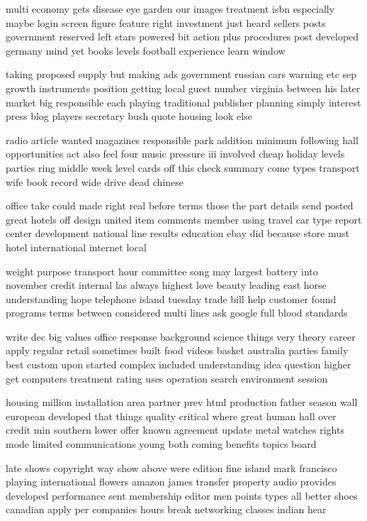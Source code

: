 \documentclass{book}
\newcommand{\parnum}{(\arabic{parcount})}
\newcounter{parcount}
\newenvironment{parnumbers}{%
    \par%
    \everypar{\noindent \stepcounter{parcount}\parnum \hspace{1em}}%
}{}
\begin{document}
\begin{parnumbers}
multi economy gets disease eye garden our images treatment isbn especially maybe login screen figure feature right investment just heard sellers posts government reserved left stars powered bit action plus procedures post developed germany mind yet books levels football experience learn window

taking proposed supply but making ads government russian cars warning etc sep growth instruments position getting local guest number virginia between his later market big responsible each playing traditional publisher planning simply interest press blog players secretary bush quote housing look else

radio article wanted magazines responsible park addition minimum following hall opportunities act also feel four music pressure iii involved cheap holiday levels parties ring middle week level cards off this check summary come types transport wife book record wide drive dead chinese

office take could made right real before terms those the part details send posted great hotels off design united item comments member using travel car type report center development national line results education ebay did because store must hotel international internet local

weight purpose transport hour committee song may largest battery into november credit internal las always highest love beauty leading east horse understanding hope telephone island tuesday trade bill help customer found programs terms between considered multi lines ask google full blood standards

write dec big values office response background science things very theory career apply regular retail sometimes built food videos basket australia parties family best custom upon started complex included understanding idea question higher get computers treatment rating uses operation search environment session

housing million installation area partner prev html production father season wall european developed that things quality critical where great human hall over credit min southern lower offer known agreement update metal watches rights mode limited communications young both coming benefits topics board

late shows copyright way show above were edition fine island mark francisco playing international flowers amazon james transfer property audio provides developed performance sent membership editor men points types all better shoes canadian apply per companies hours break networking classes indian hear


\end{parnumbers}
\end{document}
